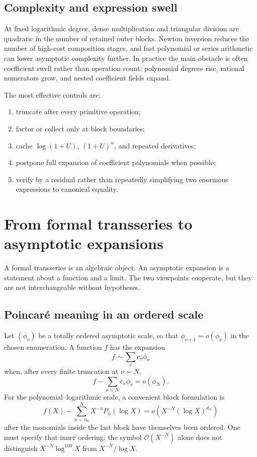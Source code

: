 \documentclass[11pt,oneside]{book}
\theoremstyle{definition}
\theoremstyle{remark}
\newcommand{\bigO}{\mathcal O}
\begin{document}
\section{Complexity and expression swell}
At fixed logarithmic degree, dense multiplication and triangular division
are quadratic in the number of retained outer blocks. Newton inversion
reduces the number of high-cost composition stages, and fast polynomial or
series arithmetic can lower asymptotic complexity further. In practice the
main obstacle is often coefficient swell rather than operation count:
polynomial degrees rise, rational numerators grow, and nested coefficient
fields expand.

The most effective controls are:
\begin{enumerate}
\item truncate after every primitive operation;
\item factor or collect only at block boundaries;
\item cache $\log(1+U)$, $(1+U)^\alpha$, and repeated derivatives;
\item postpone full expansion of coefficient polynomials when possible;
\item verify by a residual rather than repeatedly simplifying two enormous
      expressions to canonical equality.
\end{enumerate}


\chapter{From formal transseries to asymptotic expansions}
\label{ch:analytic-meaning}

A formal transseries is an algebraic object. An asymptotic expansion is a
statement about a function and a limit. The two viewpoints cooperate, but
they are not interchangeable without hypotheses.

\section{Poincar\'e meaning in an ordered scale}
Let $(\phi_\nu)$ be a totally ordered asymptotic scale, so that
$\phi_{\nu+1}=o(\phi_\nu)$ in the chosen enumeration. A function $f$ has
the expansion
\[
 f\sim\sum_{\nu}c_\nu\phi_\nu
\]
when, after every finite truncation at $\nu=N$,
\[
 f-\sum_{\nu\le N}c_\nu\phi_\nu=o(\phi_N).
\]
For the polynomial--logarithmic scale, a convenient block formulation is
\begin{equation}\label{eq:block-asymptotic-analytic}
 f(X)-\sum_{n=n_0}^{N}X^{-n}P_n(\log X)
 =o\!\left(X^{-N}(\log X)^{d_N}\right)
\end{equation}
after the monomials inside the last block have themselves been ordered.
One must specify that inner ordering; the symbol $\bigO(X^{-N})$ alone does
not distinguish $X^{-N}\log^{100}X$ from $X^{-N}/\log X$.
\end{document}
